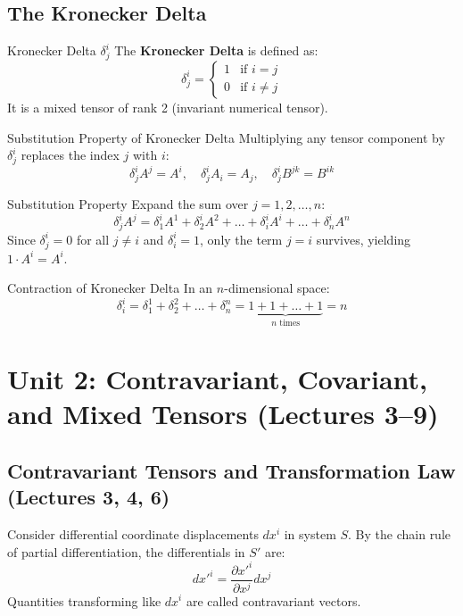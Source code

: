 \documentclass[11pt,a4paper]{article}
\begin{document}
\subsection{The Kronecker Delta}
\begin{definitionbox}{Kronecker Delta $\delta^i_j$}
The \textbf{Kronecker Delta} is defined as:
\[
\delta^i_j = \begin{cases} 1 & \text{if } i = j \\ 0 & \text{if } i \neq j \end{cases}
\]
It is a mixed tensor of rank 2 (invariant numerical tensor).
\end{definitionbox}

\begin{theorembox}{Substitution Property of Kronecker Delta}
Multiplying any tensor component by $\delta^i_j$ replaces the index $j$ with $i$:
\[
\delta^i_j A^j = A^i, \quad \delta^i_j A_i = A_j, \quad \delta^i_j B^{jk} = B^{ik}
\]
\end{theorembox}
\begin{proofbox}{Substitution Property}
Expand the sum over $j = 1, 2, \dots, n$:
\[
\delta^i_j A^j = \delta^i_1 A^1 + \delta^i_2 A^2 + \dots + \delta^i_i A^i + \dots + \delta^i_n A^n
\]
Since $\delta^i_j = 0$ for all $j \neq i$ and $\delta^i_i = 1$, only the term $j = i$ survives, yielding $1 \cdot A^i = A^i$.
\end{proofbox}

\begin{importantbox}{Contraction of Kronecker Delta}
In an $n$-dimensional space:
\[
\delta^i_i = \delta^1_1 + \delta^2_2 + \dots + \delta^n_n = \underbrace{1 + 1 + \dots + 1}_{n \text{ times}} = n
\]
\end{importantbox}

\newpage
\section{Unit 2: Contravariant, Covariant, and Mixed Tensors (Lectures 3--9)}

\subsection{Contravariant Tensors and Transformation Law (Lectures 3, 4, 6)}
Consider differential coordinate displacements $dx^i$ in system $S$. By the chain rule of partial differentiation, the differentials in $S'$ are:
\[
dx'^i = \frac{\partial x'^i}{\partial x^j} dx^j
\]
Quantities transforming like $dx^i$ are called contravariant vectors.
\end{document}
